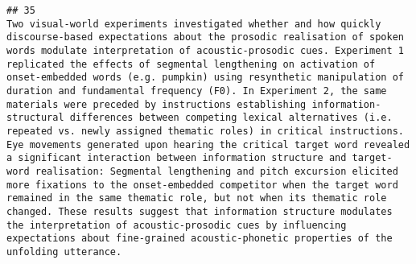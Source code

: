 \documentclass[
  english,
  man]{apa6}
\begin{document}
\begin{verbatim}
## 35                                                                                                                                                                                                                                                                                                                                                                                                                                                                                                                                                                                                                                                                                                                                                                                                                                                                                                                                                                                                                                                                                                                                                                                                                                                                                                                                                                                                                                                        Two visual-world experiments investigated whether and how quickly discourse-based expectations about the prosodic realisation of spoken words modulate interpretation of acoustic-prosodic cues. Experiment 1 replicated the effects of segmental lengthening on activation of onset-embedded words (e.g. pumpkin) using resynthetic manipulation of duration and fundamental frequency (F0). In Experiment 2, the same materials were preceded by instructions establishing information-structural differences between competing lexical alternatives (i.e. repeated vs. newly assigned thematic roles) in critical instructions. Eye movements generated upon hearing the critical target word revealed a significant interaction between information structure and target-word realisation: Segmental lengthening and pitch excursion elicited more fixations to the onset-embedded competitor when the target word remained in the same thematic role, but not when its thematic role changed. These results suggest that information structure modulates the interpretation of acoustic-prosodic cues by influencing expectations about fine-grained acoustic-phonetic properties of the unfolding utterance.

\end{verbatim}
\end{document}
